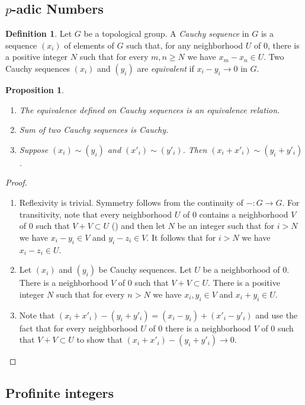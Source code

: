 \documentclass[12pt]{article}
\newtheorem{prop}[thm]{Proposition}
\theoremstyle{definition}
\newtheorem{dfn}[thm]{Definition}
\theoremstyle{remark}
\begin{document}
    \subsection{$p$-adic Numbers}

    \begin{dfn}
        Let $G$ be a topological group. A \emph{Cauchy sequence} in $G$ is a sequence $(x_i)$ of elements of $G$ such that, for any neighborhood $U$ of $0$, there is a positive integer $N$ such that for every $m,n\geq N$ we have $x_m-x_n\in U$. Two Cauchy sequences $(x_i)$ and $(y_i)$ are \emph{equivalent} if $x_i-y_i\to 0$ in $G$.
    \end{dfn}

    \begin{prop}
        \begin{enumerate}[label=(\alph*)]
            \item The equivalence defined on Cauchy sequences is an equivalence relation.
            \item Sum of two Cauchy sequences is Cauchy.
            \item Suppose $(x_i)\sim(y_i)$ and $(x'_i)\sim(y'_i)$. Then $(x_i+x'_i)\sim(y_i+y'_i)$.
        \end{enumerate}
    \end{prop}
    
    \begin{proof}
        \begin{enumerate}[label=(\alph*)]
            \item Reflexivity is trivial. Symmetry follows from the continuity of $-\colon G\to G$. For transitivity, note that every neighborhood $U$ of $0$ contains a neighborhood $V$ of $0$ such that $V+V\subset U$ (\cite[Proposition 1-1(i)]{FANF1999}) and then let $N$ be an integer such that for $i>N$ we have $x_i-y_i\in V$ and $y_i-z_i\in V$. It follows that for $i>N$ we have $x_i-z_i\in U$.
            \item Let $(x_i)$ and $(y_i)$ be Cauchy sequences. Let $U$ be a neighborhood of $0$. There is a neighborhood $V$ of $0$ such that $V+V\subset U$. There is a positive integer $N$ such that for every $n>N$ we have $x_i,y_i\in V$ and $x_i+y_i\in U$.
            \item Note that $(x_i+x'_i)-(y_i+y'_i)=(x_i-y_i)+(x'_i-y'_i)$ and use the fact that for every neighborhood $U$ of $0$ there is a neighborhood $V$ of $0$ such that $V+V\subset U$ to show that $(x_i+x'_i)-(y_i+y'_i)\to 0$.
        \end{enumerate}
    \end{proof}

    \subsection{Profinite integers}

    \printbibliography
\end{document}
